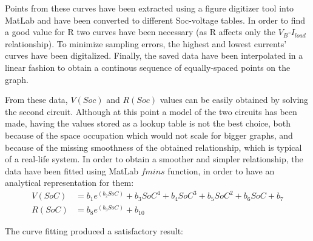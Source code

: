 Points from these curves have been extracted using a figure digitizer tool into MatLab and have been converted to different Soc-voltage tables. In order to find a good value for R two curves have been necessary (as R affects only the $V_{B}$-$I_{load}$ relationship). To minimize sampling errors, the highest and lowest currents' curves have been digitalized. Finally, the saved data have been interpolated in a linear fashion to obtain a continous sequence of equally-spaced points on the graph.

From these data, $V(Soc)$ and $R(Soc)$ values can be easily obtained by solving the second circuit. Although at this point a model of the two circuits has been made, having the values stored as a lookup table is not the best choice, both because of the space occupation which would not scale for bigger graphs, and because of the missing smoothness of the obtained relationship, which is typical of a real-life system. In order to obtain a smoother and simpler relationship, the data have been fitted using MatLab $fmins$ function, in order to have an analytical representation for them:
\begin{align*}
V(SoC)&=b_1e^{(b_2SoC)}+b_3SoC^4+b_4SoC^3+b_5SoC^2+b_6SoC+b_7 \\
R(SoC)&=b_8e^{(b_9SoC)}+b_{10}
\end{align*}

The curve fitting produced a satisfactory result:

